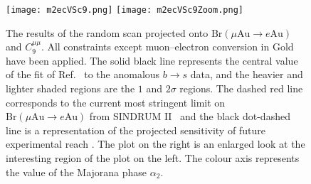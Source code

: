  \begin{figure}[t]
  \centering
  \texttt{[image: m2ecVSc9.png]}
  \texttt{[image: m2ecVSc9Zoom.png]}
  \caption[The results of the random scan projected onto
  $\text{Br}(\mu \text{Au} \to e \text{Au})$ and $C_{9}^{\mu\mu}$.]{The results
    of the random scan projected onto $\text{Br}(\mu \text{Au} \to e \text{Au})$
    and $C_{9}^{\mu\mu}$. All constraints except muon--electron conversion in
    Gold have been applied. The solid black line represents the central value of
    the fit of Ref.~\cite{Aebischer:2019mlg} to the anomalous $b \to s$ data,
    and the heavier and lighter shaded regions are the $1$ and $2\sigma$
    regions. The dashed red line corresponds to the current most stringent limit
    on $\text{Br}(\mu \text{Au} \to e \text{Au})$ from SINDRUM
    II~\cite{Bertl:2006up} and the black dot-dashed line is a representation of
    the projected sensitivity of future experimental reach \cite{KURUP201138,
      Cui:2009zz, Wu:2017zwh, Adamov:2018vin, Bartoszek:2014mya,
      Pezzullo:2018fzp, Bonventre:2019grv}. The plot on the right is an enlarged
    look at the interesting region of the plot on the left. The colour axis
    represents the value of the Majorana phase $\alpha_{2}$.}
  \label{fig:ch4-m2ecVSc9}
\end{figure}


